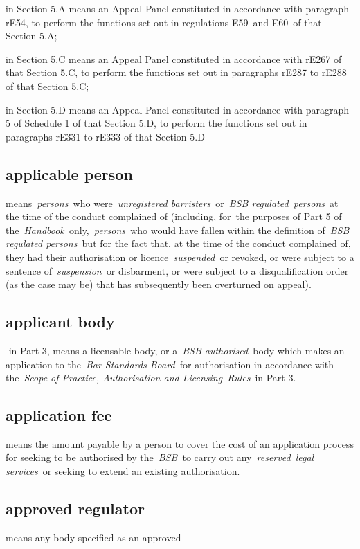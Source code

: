 \al \item in Section 5.A means an Appeal Panel
  constituted in accordance with paragraph rE54, to perform the
  functions set out in regulations E59~and E60~of that Section 5.A;
  \item in Section 5.C means an Appeal Panel constituted in accordance with
  rE267 of that Section 5.C, to perform the functions set out in
  paragraphs rE287 to rE288 of that Section 5.C;
  \item in Section 5.D
  means an Appeal Panel constituted in accordance with paragraph 5 of
  Schedule 1 of that Section 5.D, to perform the functions set out in
  paragraphs rE331 to rE333 of that Section 5.D \la  \subsection{applicable person } means~\emph{persons~}who
  were~\emph{unregistered barristers~}or~\emph{BSB regulated~persons}~at
  the time of the conduct complained of (including, for~the purposes of
  Part 5 of the~\emph{Handbook~}only,~\emph{persons~}who would have
  fallen within the definition of~\emph{BSB regulated persons~}but for
  the fact that, at the time of the conduct complained of, they had
  their authorisation or licence~\emph{suspended~}or revoked, or were
  subject to a sentence of~\emph{suspension~}or disbarment, or were
  subject to a disqualification order (as the case may be) that has
  subsequently been overturned on appeal).  \subsection{applicant body } in Part 3, means a licensable body, or
  a~\emph{BSB authorised~}body which makes an application to
  the~\emph{Bar Standards Board~}for authorisation in accordance with
  the~\emph{Scope of Practice, Authorisation and Licensing~Rules}~in
  Part 3.  \subsection{application fee } means the amount payable by a person to
  cover the cost of an application process for seeking to be authorised
  by the~\emph{BSB~}to carry out any~\emph{reserved~legal services}~or
  seeking to extend an existing authorisation.  \subsection{approved regulator } means any body specified as an approved
